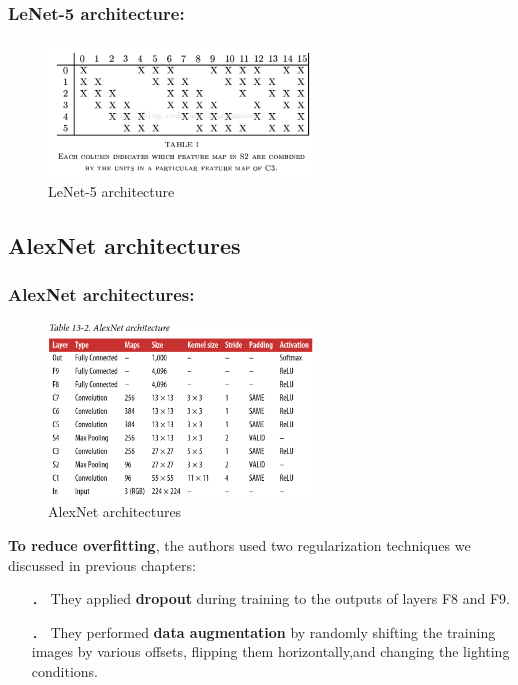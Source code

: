 \documentclass{beamer}
\begin{document}
    \begin{frame}
    \frametitle{LeNet-5 architecture: }
        \begin{figure}[H]
            \begin{center}
                \includegraphics[width=7cm]{table13-4}
            \end{center}
        \caption{LeNet-5 architecture}
        \end{figure}
    \end{frame}
\subsection{AlexNet architectures}
    \begin{frame}

    \end{frame}
    \begin{frame}
    \frametitle{AlexNet architectures: }
        \begin{figure}[H]
            \begin{center}
                \includegraphics[width=7cm]{table13-2}
            \end{center}
        \caption{AlexNet architectures}
        \end{figure}
    \end{frame}

    \begin{frame}
    \textbf{To reduce overfitting}, the authors used two regularization techniques we discussed in previous chapters:
        \begin{itemize}
            \item[．] They applied \textbf{dropout} during training to the outputs of layers F8 and F9.
            \item[．] They performed \textbf{data augmentation} by randomly shifting the training images by various offsets, flipping them horizontally,and changing the lighting conditions.
         \end{itemize}
    \end{frame}
\end{document}
